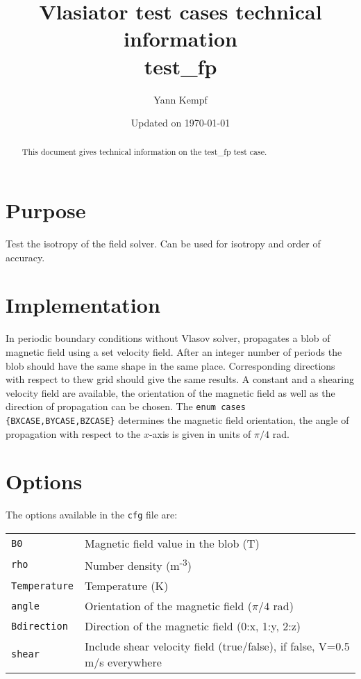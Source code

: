 \documentclass[a4paper,10pt]{scrartcl}
\title{
\Huge{Vlasiator test cases technical information} \\
\LARGE{test\_fp}
}
\author{Yann Kempf}
\date{Updated on \today}
\begin{document}
\maketitle

\begin{abstract}
   This document gives technical information on the test\_fp test case.
\end{abstract}

\section{Purpose}
Test the isotropy of the field solver. Can be used for isotropy and order of accuracy.

\section{Implementation}
In periodic boundary conditions without Vlasov solver, propagates a blob of magnetic field using a set velocity field. After an integer number of periods the blob should have the same shape in the same place. Corresponding directions with respect to thew grid should give the same results. A constant and a shearing velocity field are available, the orientation of the magnetic field as well as the direction of propagation can be chosen. The \verb=enum cases {BXCASE,BYCASE,BZCASE}= determines the magnetic field orientation, the angle of propagation with respect to the $x$-axis is given in units of $\pi/4$ rad.

\section{Options}
The options available in the \verb=cfg= file are:

\begin{tabularx}{\textwidth}{lX}
   \verb=B0= & Magnetic field value in the blob (T) \\
   \verb=rho= & Number density (m\textsuperscript{-3}) \\
   \verb=Temperature= & Temperature (K) \\
   \verb=angle= & Orientation of the magnetic field ($\pi/4$ rad) \\
   \verb=Bdirection= & Direction of the magnetic field (0:x, 1:y, 2:z) \\
   \verb=shear= & Include shear velocity field (true/false), if false, V=0.5 m/s everywhere
\end{tabularx}
\end{document}
